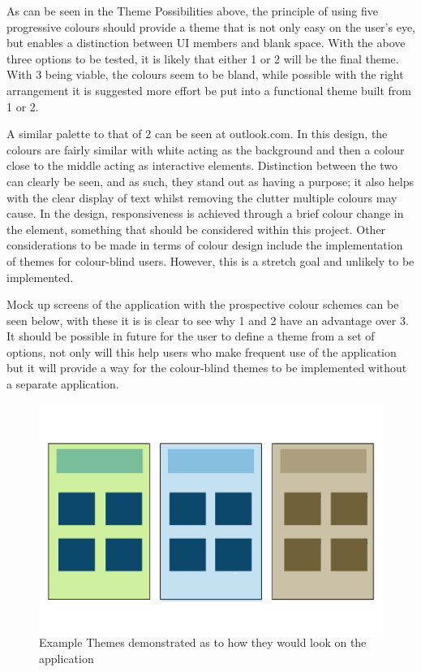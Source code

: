 \newpage
As can be seen in the Theme Possibilities above, the principle of using five progressive colours should provide a theme that is not only easy on the user's eye, but enables a distinction between UI members and blank space. With the above three options to be tested, it is likely that either 1 or 2 will be the final theme. With 3 being viable, the colours seem to be bland, while possible with the right arrangement it is suggested more effort be put into a functional theme built from 1 or 2. 

A similar palette to that of 2 can be seen at outlook.com\cite{out}. In this design, the colours are fairly similar with white acting as the background and then a colour close to the middle acting as interactive elements. Distinction between the two can clearly be seen, and as such, they stand out as having a purpose; it also helps with the clear display of text whilst removing the clutter multiple colours may cause. In the design, responsiveness is achieved through a brief colour change in the element, something that should be considered within this project. Other considerations to be made in terms of colour design include the implementation of themes for colour-blind users. However, this is a stretch goal and unlikely to be implemented. 

Mock up screens of the application with the prospective colour schemes can be seen below, with these it is is clear to see why 1 and 2 have an advantage over 3. It should be possible in future for the user to define a theme from a set of options, not only will this help users who make frequent use of the application but it will provide a way for the colour-blind themes to be implemented without a separate application. \\
\begin{figure}
\includegraphics[scale=0.7]{Chapter2/themes.png} 
\caption[Example Themes]{Example Themes demonstrated as to how they would look on the application}
\end{figure}


